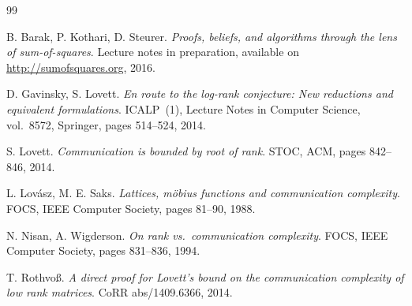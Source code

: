\documentclass{aicr-conjecture}
\begin{document}
\begin{aicrbibliography}{99}

B. Barak, P. Kothari, D. Steurer.
\emph{Proofs, beliefs, and algorithms through the lens of
sum-of-squares}.
Lecture notes in preparation, available on
\url{http://sumofsquares.org}, 2016.

D. Gavinsky, S. Lovett.
\emph{En route to the log-rank conjecture: New reductions and
equivalent formulations}.
ICALP~(1), Lecture Notes in Computer Science, vol.~8572, Springer,
pages 514--524, 2014.

S. Lovett.
\emph{Communication is bounded by root of rank}.
STOC, ACM, pages 842--846, 2014.

L. Lov\'{a}sz, M. E. Saks.
\emph{Lattices, m\"{o}bius functions and communication complexity}.
FOCS, IEEE Computer Society, pages 81--90, 1988.

N. Nisan, A. Wigderson.
\emph{On rank vs.\ communication complexity}.
FOCS, IEEE Computer Society, pages 831--836, 1994.

T. Rothvo{\ss}.
\emph{A direct proof for Lovett's bound on the communication
complexity of low rank matrices}.
CoRR abs/1409.6366, 2014.

\end{aicrbibliography}
\end{document}
